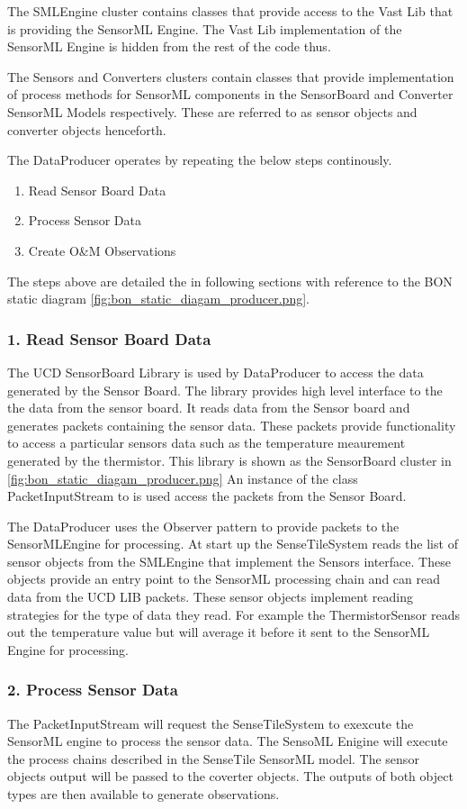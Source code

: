 \documentclass[]{final_report}
\begin{document}
The SMLEngine cluster contains classes that provide access to
the Vast Lib that is providing the SensorML Engine.  The Vast Lib implementation
of the SensorML Engine is hidden from the rest of the code thus.

The Sensors and Converters clusters contain classes that provide
implementation of process methods for SensorML components in the SensorBoard and
Converter SensorML Models respectively. These are referred to as sensor objects and
converter objects henceforth.

The DataProducer operates by repeating the below steps continously.
 \begin{enumerate}
\item Read Sensor Board Data
\item Process Sensor Data
\item Create O\&M Observations
\end{enumerate}
The steps above are detailed the in following sections with reference
to the BON static diagram \ref{fig:bon_static_diagam_producer.png}.

\subsubsection {1. Read Sensor Board Data}

The UCD SensorBoard Library is used by DataProducer to access
the data generated by the Sensor Board.
The library provides high level interface to the
the data from the sensor board. It reads data from the Sensor board and generates packets
containing the sensor data. These packets provide functionality
to access a particular sensors data such as the temperature
meaurement generated by the thermistor. 
This library is shown as the SensorBoard cluster in \ref{fig:bon_static_diagam_producer.png}
An instance of the class PacketInputStream to is used access the packets from the Sensor Board.

The DataProducer uses the Observer pattern to provide
packets to the SensorMLEngine for processing.
At start up the SenseTileSystem reads the list of sensor objects from the SMLEngine that
implement the Sensors interface. These objects provide an entry point
to the SensorML processing chain and can read data from the UCD LIB packets.
These sensor objects implement reading strategies for the type of data they read. 
For example the ThermistorSensor reads out the temperature value
but will average it before it sent to the SensorML Engine for processing.

\subsubsection {2. Process Sensor Data}
The PacketInputStream will request the SenseTileSystem to exexcute
the SensorML engine to process the sensor data. The SensoML Enigine
will execute the process chains described in the SenseTile SensorML model.
The sensor objects output will be passed to the coverter objects. The
outputs of both object types are then available to generate observations.
\end{document}
